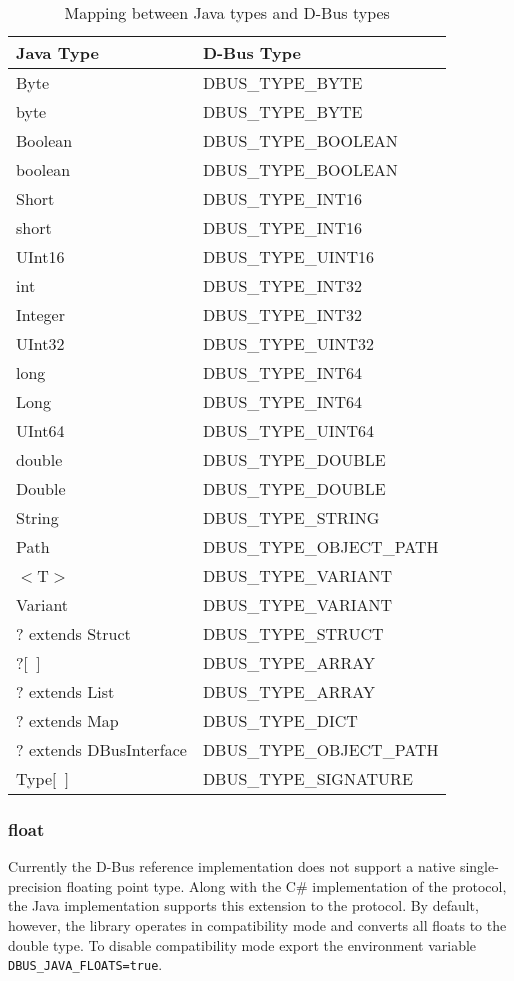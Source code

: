 \documentclass[a4paper,12pt]{article}
\begin{document}
\begin{table}
\begin{center}
\begin{tabular}{l|l}
\bf Java Type & \bf D-Bus Type \\
\hline
Byte	&	DBUS\_TYPE\_BYTE	\\
byte	&	DBUS\_TYPE\_BYTE	\\
Boolean	&	DBUS\_TYPE\_BOOLEAN	\\
boolean	&	DBUS\_TYPE\_BOOLEAN	\\
Short	&	DBUS\_TYPE\_INT16	\\
short	&	DBUS\_TYPE\_INT16	\\
UInt16	&	DBUS\_TYPE\_UINT16	\\
int	&	DBUS\_TYPE\_INT32	\\
Integer	&	DBUS\_TYPE\_INT32	\\
UInt32	&	DBUS\_TYPE\_UINT32	\\
long	&	DBUS\_TYPE\_INT64	\\
Long	&	DBUS\_TYPE\_INT64	\\
UInt64	&	DBUS\_TYPE\_UINT64	\\
double	&	DBUS\_TYPE\_DOUBLE	\\
Double	&	DBUS\_TYPE\_DOUBLE	\\
String	&	DBUS\_TYPE\_STRING	\\
Path	&	DBUS\_TYPE\_OBJECT\_PATH	\\
$<$T$>$	&	DBUS\_TYPE\_VARIANT	\\
Variant	&	DBUS\_TYPE\_VARIANT	\\
? extends Struct	&	DBUS\_TYPE\_STRUCT	\\
?$[$~$]$	&	DBUS\_TYPE\_ARRAY	\\
? extends List	&	DBUS\_TYPE\_ARRAY	\\
? extends Map	&	DBUS\_TYPE\_DICT	\\
? extends DBusInterface	&	DBUS\_TYPE\_OBJECT\_PATH	\\
Type$[$~$]$	&	DBUS\_TYPE\_SIGNATURE	\\
\end{tabular}
\end{center}
\caption{Mapping between Java types and D-Bus types}
\label{table:types}
\end{table}

\subsubsection{float}

Currently the D-Bus reference implementation does not support a native
single-precision floating point type. Along with the C\# implementation of the
protocol, the Java implementation supports this extension to the protocol. By
default, however, the library operates in compatibility mode and converts all
floats to the double type. To disable compatibility mode export the environment
variable {\tt DBUS\_JAVA\_FLOATS=true}.
\end{document}
